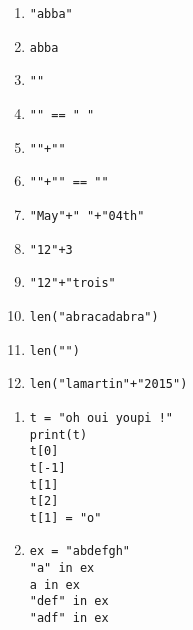 
\begin{multicols}{2}
  \begin{enumerate}[label=\emph{\alph*)}]
    \item \texttt{"abba"}
    \item \texttt{abba}
    \item \texttt{""}
    \item \texttt{"" == " "}
    \item \texttt{""+""}
    \item \texttt{""+"" == ""}
    \item \texttt{"May"+" "+"04th"}
    \item \texttt{"12"+3}
    \item \texttt{"12"+"trois"}
    \item \texttt{len("abracadabra")}
    \item \texttt{len("")}
    \item \texttt{len("lamartin"+"2015")}
  \end{enumerate}
\end{multicols}


\begin{enumerate}[label=\emph{\alph*)}]
\item 
\begin{lstlisting}
t = "oh oui youpi !"
print(t)
t[0]
t[-1]
t[1]
t[2]
t[1] = "o" 
\end{lstlisting}
\end{enumerate}
\begin{enumerate}[label=\emph{\alph*)}]
\setcounter{enumi}{1}
\item
\begin{lstlisting}
ex = "abdefgh"
"a" in ex
a in ex
"def" in ex
"adf" in ex
\end{lstlisting}
\end{enumerate}


